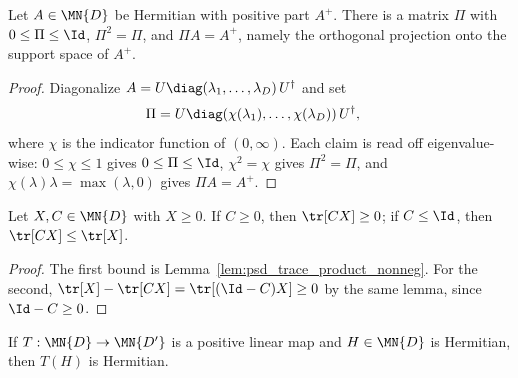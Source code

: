 \begin{lemma}
    \label{lem:positive_part_support_projection}
    \leanok
    Let $A\in\MN{D}$ be Hermitian with positive part $A^+$. There is a
    matrix $\Pi$ with $0\leq\Pi\leq\Id$, $\Pi^2=\Pi$, and $\Pi A=A^+$, namely
    the orthogonal projection onto the support space of $A^+$.
\end{lemma}

\begin{proof}\leanok
    Diagonalize
    $A=U\diag(\lambda_1,\ldots,\lambda_D)\,U^\dagger$ and set
    \begin{align}
        \Pi
         & =U\diag
        (\chi(\lambda_1),\ldots,\chi(\lambda_D))\,U^\dagger,
        \notag
    \end{align}
    where $\chi$ is the indicator function of $(0,\infty)$. Each claim is
    read off eigenvalue-wise: $0\leq\chi\leq1$ gives
    $0\leq\Pi\leq\Id$, $\chi^2=\chi$ gives $\Pi^2=\Pi$, and
    $\chi(\lambda) \lambda=\max(\lambda,0)$ gives $\Pi A=A^+$.
\end{proof}

\begin{lemma}
    \label{lem:psd_trace_pairing_bounds}
    \leanok
    Let $X,C\in\MN{D}$ with $X\geq0$. If $C\geq0$, then
    $\tr[CX]\geq0$; if $C\leq\Id$, then
    $\tr[CX]\leq\tr[X]$.
\end{lemma}

\begin{proof}\leanok
    The first bound is Lemma~\ref{lem:psd_trace_product_nonneg}. For the
    second, $\tr[X]-\tr[CX]=\tr[(\Id-C)X]\geq0$
    by the same lemma, since $\Id-C\geq0$.
\end{proof}

\begin{lemma}
    \label{lem:positive_map_hermitian}
    \leanok
    If $T:\MN{D}\to\MN{D'}$ is a positive linear map and $H\in\MN{D}$ is
    Hermitian, then $T(H)$ is Hermitian.
\end{lemma}

